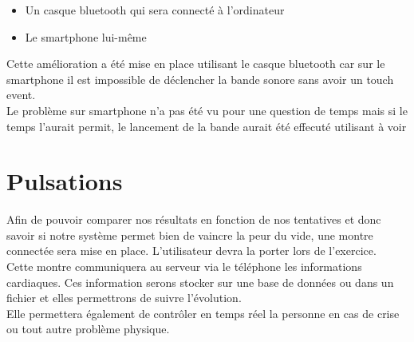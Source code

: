 \begin{itemize}
\item Un casque bluetooth qui sera connecté à l'ordinateur
\item Le smartphone lui-même\\

\end{itemize}

Cette amélioration a été mise en place utilisant le casque bluetooth car sur le smartphone il est impossible de déclencher la bande sonore sans avoir un touch event. \\
Le problème sur smartphone n'a pas été vu pour une question de temps mais si le temps l'aurait permit, le lancement de la bande aurait été effecuté utilisant \color{red} à voir \color{black} \\


\section{Pulsations}
Afin de pouvoir comparer nos résultats en fonction de nos tentatives et donc savoir si notre système permet bien de vaincre la peur du vide, une montre connectée sera mise en place. L'utilisateur devra la porter lors de l'exercice. \\
Cette montre communiquera au serveur via le téléphone les informations cardiaques. Ces information serons stocker sur une base de données ou dans un fichier et elles permettrons de suivre l'évolution.\\
Elle permettera également de contrôler en temps réel la personne en cas de crise ou tout autre problème physique. 
